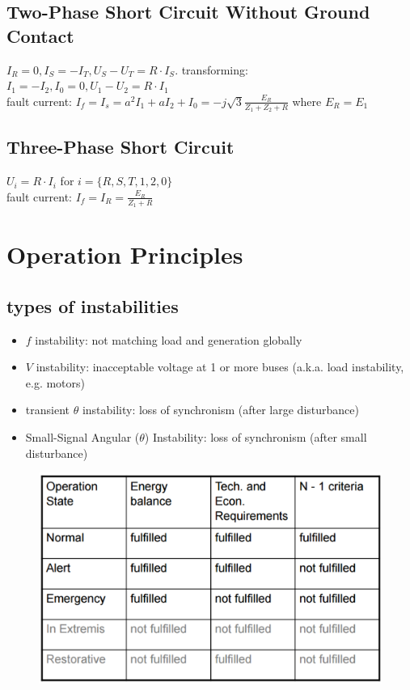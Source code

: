 \documentclass[a4paper,10pt,landscape]{scrartcl}
\begin{document}
\begin{multicols*}{3}
\subsection{Two-Phase Short Circuit Without Ground Contact}
$I_R=0,I_S=-I_T,U_S-U_T=R\cdot I_S$. transforming: $I_1=-I_2,I_0=0,U_1-U_2=R\cdot I_1$ \\
fault current: $I_f=I_s=a^2I_1+aI_2+I_0 = -j\sqrt{3}\frac{E_R}{Z_1+Z_2+R}$ where $E_R=E_1$

\subsection{Three-Phase Short Circuit}
$U_i=R\cdot I_i$ for $i=\{R,S,T,1,2,0\}$ \\
fault current: $I_f=I_R=\frac{E_R}{Z_1+R}$


\section{Operation Principles}
\subsection{types of instabilities}
\begin{itemize}
    \item $f$ instability: not matching load and generation globally
    \item $V$ instability: inacceptable voltage at 1 or more buses (a.k.a. load instability, e.g. motors)
    \item transient $\theta$ instability: loss of synchronism (after large disturbance)
    \item Small-Signal Angular ($\theta$) Instability: loss of synchronism (after small disturbance)
\end{itemize}

\begin{figure}[H]
    \centering
    \includegraphics[width=.9\linewidth]{src/operation_table.png}
\end{figure}


\end{multicols*}
\end{document}
